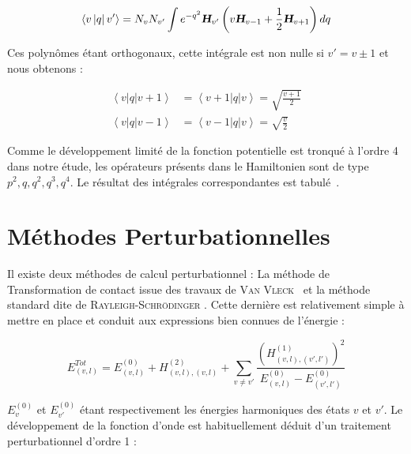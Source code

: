 \begin{equation}
	\left\langle v \left|q \right|v' \right\rangle = N_v N_{v'} \int e^{-q^2} \textsl{\textbf{H}}_{v'}\left(v\textsl{\textbf{H}}_{v-1} + \frac{1}{2} \textsl{\textbf{H}}_{v+1}\right) dq
\end{equation}

Ces polynômes étant orthogonaux, cette intégrale est non nulle si $v' = v\pm 1$ et nous obtenons :

\begin{align}
	\left\langle v \left|q \right| v+1\right\rangle &= \left\langle v+1 \left|q \right| v\right\rangle = \sqrt{\frac{v+1}{2}} \\
	\left\langle v \left|q \right| v-1\right\rangle &= \left\langle v-1 \left|q \right| v\right\rangle = \sqrt{\frac{v}{2}}
\end{align}

Comme le développement limité de la fonction potentielle est tronqué à l'ordre 4 dans notre étude, les opérateurs présents dans le Hamiltonien sont de type $p^2,q,q^2,q^3,q^4$. Le résultat des intégrales correspondantes est tabulé~\cite{carbonniere2002calcul}.



\section{Méthodes Perturbationnelles}

Il existe deux méthodes de calcul perturbationnel : La méthode de \og Transformation de contact \fg{} issue des travaux de \textsc{Van Vleck}~\cite{papousek1982molecular,van1929sigma} et la méthode standard dite de \textsc{Rayleigh-Schrödinger} \cite{oka1967vibration}.
Cette dernière est relativement simple à mettre en place et conduit aux expressions bien connues de l'énergie :

\begin{equation}
	E^{Tot}_{(v,l)} = E^{(0)}_{(v,l)} + H^{(2)}_{(v,l),(v,l)} + \sum_{v\neq v'} \frac{(H^{(1)}_{(v,l),(v',l')})^2}{E^{(0)}_{(v,l)} - E^{(0)}_{(v',l')}}
\end{equation}

$E^{(0)}_v$ et $E^{(0)}_{v'}$ étant respectivement les énergies harmoniques des états $v$ et $v'$.
Le développement de la fonction d'onde est habituellement déduit d'un traitement perturbationnel d'ordre 1 :


